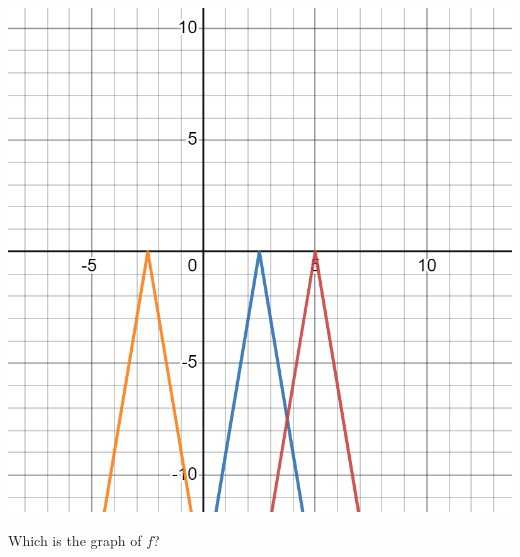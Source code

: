 \documentclass{ximera}
\begin{document}
\begin{exercise}
\begin{exercise}
\begin{exercise}
\begin{exercise}
\begin{exercise}
\begin{exercise}
\begin{exercise}
\begin{exercise}
\includegraphics[width=1\linewidth]{FT24graph.png}

Which is the graph of $f$?
\begin{multipleChoice}

\end{multipleChoice}


\end{exercise}
\end{exercise}
\end{exercise}
\end{exercise}
\end{exercise}
\end{exercise}
\end{exercise}
\end{exercise}
\end{document}
